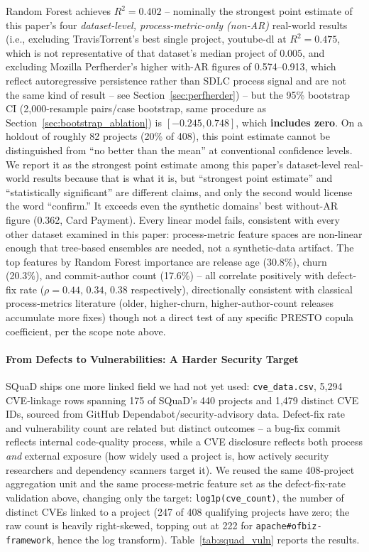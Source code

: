 \documentclass[technologies,article,submit,pdftex,moreauthors]{Definitions/mdpi}
\begin{document}
Random Forest achieves \(R^2 = 0.402\) -- nominally the strongest point
estimate of this paper's four \emph{dataset-level, process-metric-only
(non-AR)} real-world results (i.e., excluding
TravisTorrent's best single project, youtube-dl at \(R^2 = 0.475\),
which is not representative of that dataset's median project of
\(0.005\), and excluding Mozilla Perfherder's higher with-AR figures of
0.574--0.913, which reflect autoregressive persistence rather than SDLC
process signal and are not the same kind of result -- see
Section~\ref{sec:perfherder}) -- but the 95\% bootstrap CI (2,000-resample
pairs/case bootstrap, same procedure as Section~\ref{sec:bootstrap_ablation}) is
\([-0.245, 0.748]\), which \textbf{includes zero}. On a holdout of
roughly 82 projects (20\% of 408), this point estimate cannot be
distinguished from ``no better than the mean'' at conventional
confidence levels. We report it as the strongest point estimate among
this paper's dataset-level real-world results because that is what it
is, but ``strongest point estimate'' and ``statistically significant''
are different claims, and only the second would license the word
``confirm.''
It exceeds even the synthetic domains' best without-AR
figure (0.362, Card Payment). Every linear model fails, consistent with every other dataset examined in this paper:
process-metric feature spaces are non-linear enough that tree-based
ensembles are needed, not a synthetic-data artifact. The top features by
Random Forest importance are release age (30.8\%), churn (20.3\%), and
commit-author count (17.6\%) -- all correlate positively with defect-fix
rate (\(\rho = 0.44\), \(0.34\), \(0.38\) respectively), directionally
consistent with classical process-metrics literature (older,
higher-churn, higher-author-count releases accumulate more fixes) though
not a direct test of any specific PRESTO copula coefficient, per the
scope note above.

\paragraph{From Defects to Vulnerabilities: A Harder Security
Target}\label{sec:squad_vuln}

SQuaD ships one more linked field we had not yet used:
\texttt{cve\_data.csv}, 5,294 CVE-linkage rows spanning 175 of SQuaD's
440 projects and 1,479 distinct CVE IDs, sourced from GitHub
Dependabot/security-advisory data. Defect-fix rate and vulnerability
count are related but distinct outcomes -- a bug-fix commit reflects
internal code-quality process, while a CVE disclosure reflects both
process \emph{and} external exposure (how widely used a project is, how
actively security researchers and dependency scanners target it). We
reused the same 408-project aggregation unit and the same process-metric
feature set as the defect-fix-rate validation above, changing only the
target: \texttt{log1p(cve\_count)}, the number of distinct CVEs linked
to a project (247 of 408 qualifying projects have zero; the raw count is
heavily right-skewed, topping out at 222 for
\texttt{apache\#ofbiz-framework}, hence the log transform). Table~\ref{tab:squad_vuln} reports the results.
\end{document}
